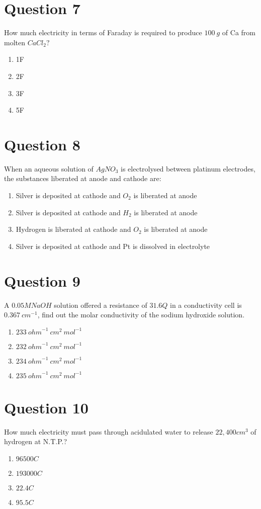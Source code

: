 \documentclass{article}
\begin{document}
\section*{Question 7}
How much electricity in terms of Faraday is required to produce \(100 {~g}\) of Ca from molten \(C a C l_{2} ?\)
\begin{enumerate}[label=(\alph*)]
\item 1F
\item 2F
\item 3F
\item 5F
\end{enumerate}
\newpage
\section*{Question 8}
When an aqueous solution of \(A g N O_{3}\) is electrolysed between platinum electrodes, the substances liberated at anode and cathode are:
\begin{enumerate}[label=(\alph*)]
\item Silver is deposited at cathode and \(O_{2}\) is liberated at anode
\item Silver is deposited at cathode and \(H_{2}\) is liberated at anode
\item Hydrogen is liberated at cathode and \(O_{2}\) is liberated at anode
\item Silver is deposited at cathode and Pt is dissolved in electrolyte
\end{enumerate}
\newpage
\section*{Question 9}
A \(0.05 {M} {NaOH}\) solution offered a resistance of \(31.6 {Q}\) in a conductivity cell is \(0.367 {~cm}^{-1}\), find out the molar conductivity of the sodium hydroxide solution.
\begin{enumerate}[label=(\alph*)]
\item \(233 {~ohm}^{-1} {~cm}^{2} {~mol}^{-1}\)
\item \(232 {~ohm}^{-1} {~cm}^{2} {~mol}^{-1}\)
\item \(234 {~ohm}^{-1} {~cm}^{2} {~mol}^{-1}\)
\item \(235 {~ohm}^{-1} {~cm}^{2} {~mol}^{-1}\)
\end{enumerate}
\newpage
\section*{Question 10}
How much electricity must pass through acidulated water to release \(22,400 cm ^3\) of hydrogen at N.T.P.?
\begin{enumerate}[label=(\alph*)]
\item \(96500 C\)
\item \(193000 C\)
\item \(22.4 C\)
\item \(95.5 C\)
\end{enumerate}
\newpage
\end{document}
